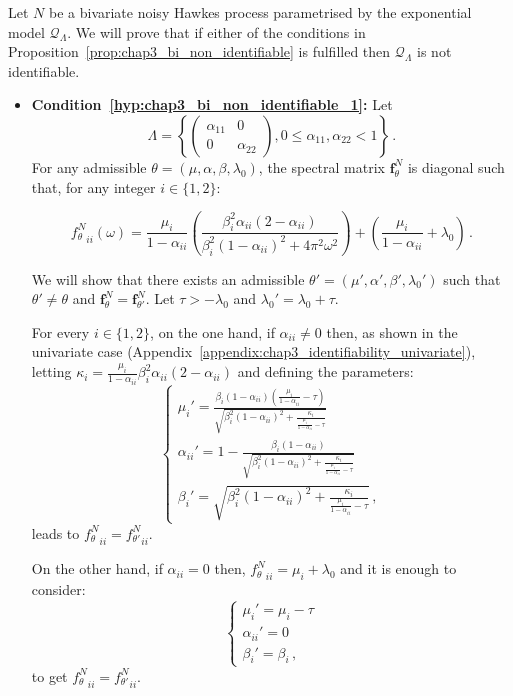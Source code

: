 \begin{subappendices}
Let $N$ be a bivariate noisy Hawkes process parametrised by the exponential model $\mathcal{Q}_\Lambda$. We will prove that if either of the conditions in Proposition~\ref{prop:chap3_bi_non_identifiable} is fulfilled then $\mathcal{Q}_\Lambda$ is not identifiable.

\begin{itemize}

\item \textbf{Condition~\ref{hyp:chap3_bi_non_identifiable_1}:} Let 
\[\Lambda = \left\{ \begin{pmatrix} \alpha_{11} & 0 \\ 0 & \alpha_{22} \end{pmatrix}, 0 \le \alpha_{11}, \alpha_{22} < 1 \right\}\,.\]
For any admissible $\theta = (\mu, \alpha, \beta, \lambda_0)$, the spectral matrix $\mathbf{f}_{\theta}^N$ is diagonal such that, for any integer $i\in\{1,2\}$:

\[{ f_{\theta}^N }_{ii}(\omega) = \frac{\mu_i}{1-\alpha_{ii}}\left(\frac{\beta_i^2 \alpha_{ii} (2-\alpha_{ii})}{\beta_i^2 (1-\alpha_{ii})^2 + 4 \pi^2 \omega^2} \right) + \left(\frac{\mu_i}{1-\alpha_{ii}} + \lambda_0\right)\,.\] 

We will show that there exists an admissible $\theta' = (\mu', \alpha', \beta', \lambda_0')$ such that $\theta'\neq \theta$ and $\mathbf{f}_\theta^N = \mathbf{f}_{\theta'}^N$. Let $\tau > -\lambda_0$ and $\lambda_0' = \lambda_0 + \tau$.

For every $i\in\{1,2\}$,
on the one hand, if $\alpha_{ii}\neq 0$ then, as shown in the univariate case (Appendix~\ref{appendix:chap3_identifiability_univariate}),
letting $\kappa_i = \frac{\mu_i}{1-\alpha_{ii}}\beta_i^2 \alpha_{ii} (2-\alpha_{ii})$ and defining the parameters:
\begin{equation}
\begin{cases}
\mu_i' = \frac{\beta_i(1-\alpha_{ii}) (\frac{\mu_i}{1-\alpha_{ii}}-\tau)}{\sqrt{\beta_i^2(1-\alpha_{ii})^2 + \frac{\kappa_i}{\frac{\mu_i}{1-\alpha_{ii}}-\tau}}} \\
\alpha_{ii}' = 1 - \frac{\beta_i(1 - \alpha_{ii})}{\sqrt{\beta_i^2(1-\alpha_{ii})^2 + \frac{\kappa_i}{\frac{\mu_i}{1-\alpha_{ii}}-\tau}}} \\
\beta_i' = \sqrt{\beta_i^2(1-\alpha_{ii})^2 + \frac{\kappa_i}{\frac{\mu_i}{1-\alpha_{ii}}-\tau}}\,,
\end{cases}
\end{equation}
leads to ${ f_{\theta}^N }_{ii} = { f_{\theta'}^N }_{ii}$.

On the other hand, if $\alpha_{ii}=0$ then,
${ f_{\theta}^N }_{ii} = \mu_i + \lambda_0$ and it is enough to consider:
\[
\begin{cases}
\mu_i' = \mu_i - \tau \\
\alpha_{ii}' = 0 \\
\beta_i' = \beta_i\,,
\end{cases}
\]
to get ${ f_{\theta}^N }_{ii} = { f_{\theta'}^N }_{ii}$.


\end{itemize}
\end{subappendices}
